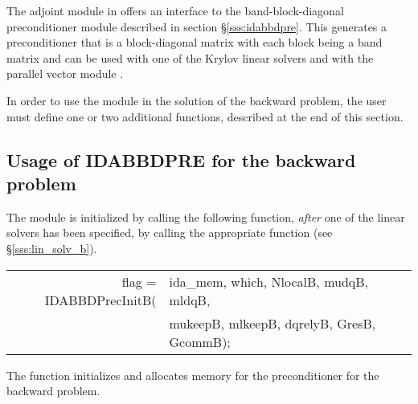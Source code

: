 The adjoint module in {\idas} offers an interface to the band-block-diagonal
preconditioner module {\idabbdpre} described in section \S\ref{sss:idabbdpre}.
This generates a preconditioner that is a block-diagonal matrix with each
block being a band matrix and can be used with one of the Krylov linear solvers
and with the parallel vector module {\nvecp}.

In order to use the {\idabbdpre} module in the solution of the backward problem,
the user must define one or two additional functions, described at the end of this section. 

\subsection{Usage of IDABBDPRE for the backward problem}
The {\idabbdpre} module is initialized by calling the following function,
{\em after} one of the {\idaspils} linear solvers has been specified,
by calling the appropriate function (see \S\ref{sss:lin_solv_b}).
{
  \begin{tabular}[t]{@{}r@{}l@{}}
    flag = IDABBDPrecInitB(&ida\_mem, which, NlocalB, mudqB, mldqB,\\
                           &mukeepB, mlkeepB, dqrelyB, GresB, GcommB);
  \end{tabular}
}
{
  The function  initializes and allocates
  memory for the {\idabbdpre} preconditioner for the backward problem.
}

